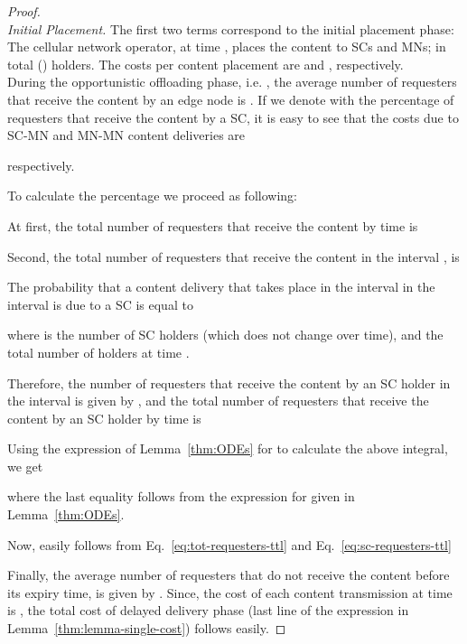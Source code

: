 \documentclass[10pt,conference,letterpaper]{IEEEtran}
\newcommand{\eq}[1]{Eq.~\eqref{#1}}
\begin{document}
\begin{proof}~\\
 {\textit{Initial Placement.}} The first two terms correspond to the initial placement phase: The cellular network operator, at time , places the content to  SCs and  MNs; in total () holders. The costs per content placement are  and , respectively.\\

 During the opportunistic offloading phase, i.e. , the average number of requesters that receive the content by an edge node is . If we denote with  the percentage of requesters that receive the content by a SC, it is easy to see that the costs due to SC-MN and MN-MN content deliveries are

respectively. 

To calculate the percentage  we proceed as following:

At first, the total number of requesters that receive the content by time  is


Second, the total number of requesters that receive the content in the interval ,  is

The probability that a content delivery that takes place in the interval in the interval  is due to a SC is equal to

where  is the number of SC holders (which does not change over time), and  the total number of holders at time .

Therefore, the number of requesters that receive the content by an SC holder in the interval  is given by , and the total number of requesters that receive the content by an SC holder by time  is

Using the expression of Lemma~\ref{thm:ODEs} for  to calculate the above integral, we get

where the last equality follows from the expression for  given in Lemma~\ref{thm:ODEs}.

Now,  easily follows from \eq{eq:tot-requesters-ttl} and \eq{eq:sc-requesters-ttl}


 Finally, the average number of requesters that do not receive the content before its expiry time, is given by . Since, the cost of each content transmission at time  is , the total cost of delayed delivery phase (last line of the expression in Lemma~\ref{thm:lemma-single-cost}) follows easily.
\end{proof}
\end{document}
